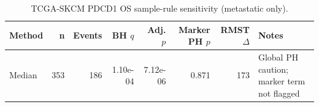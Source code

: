 \begin{table}[t]
\centering
\caption{TCGA-SKCM PDCD1 OS sample-rule sensitivity (metastatic only).}
\label{tab:skcm-pdcd1-os-metastatic-only}
\begin{tabular}{lrrrrrrl}
\toprule
Method & n & Events & BH $q$ & Adj. $p$ & Marker PH $p$ & RMST $\Delta$ & Notes \\
\midrule
Median & 353 & 186 & 1.10e-04 & 7.12e-06 & 0.871 & 173 & Global PH caution; marker term not flagged \\
\bottomrule
\end{tabular}
\end{table}
